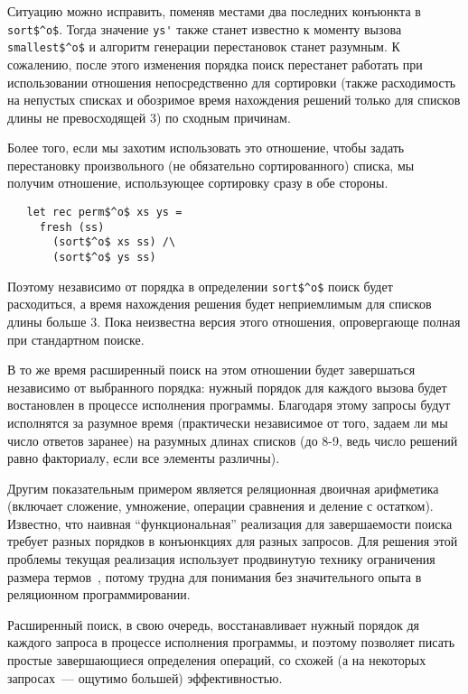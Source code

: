     Ситуацию можно исправить, поменяв местами два последних конъюнкта в \lstinline|sort$^o$|. Тогда значение \lstinline|ys'| также станет известно к моменту вызова \lstinline|smallest$^o$| и алгоритм генерации перестановок станет разумным. К сожалению, после этого изменения порядка поиск перестанет работать при использовании отношения непосредственно для сортировки (также расходимость на непустых списках и обозримое время нахождения решений только для списков длины не превосходящей $3$) по сходным причинам.
  
    Более того, если мы захотим использовать это отношение, чтобы задать перестановку произвольного (не обязательно сортированного) списка, мы получим отношение, использующее сортировку сразу в обе стороны.

\begin{lstlisting}
   let rec perm$^o$ xs ys =
     fresh (ss)
       (sort$^o$ xs ss) /\
       (sort$^o$ ys ss)
\end{lstlisting}

    Поэтому независимо от порядка в определении \lstinline|sort$^o$| поиск будет расходиться, а время нахождения решения будет неприемлимым для списков длины больше $3$. Пока неизвестна версия этого отношения, опровергающе полная при стандартном поиске.
  
    В то же время расширенный поиск на этом отношении будет завершаться независимо от выбранного порядка: нужный порядок для каждого вызова будет востановлен в процессе исполнения программы. Благодаря этому запросы будут исполнятся за разумное время (практически независимое от того, задаем ли мы число ответов заранее) на разумных длинах списков (до 8-9, ведь число решений равно факториалу, если все элементы различны).

    Другим показательным примером является реляционная двоичная арифметика (включает сложение, умножение, операции сравнения и деление с остатком). Известно, что наивная ``функциональная'' реализация для завершаемости поиска требует разных порядков в конъюнкциях для разных запросов. Для решения этой проблемы текущая реализация использует продвинутую технику ограничения размера термов~\cite{KiselyovArithmetic}, потому трудна для понимания без значительного опыта в реляционном программировании.
    
    Расширенный поиск, в свою очередь, восстанавливает нужный порядок дя каждого запроса в процессе исполнения программы, и поэтому позволяет писать простые завершающиеся определения операций, со схожей (а на некоторых запросах~--- ощутимо большей) эффективностью.
    
